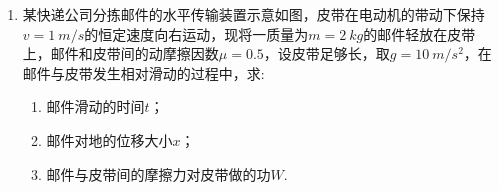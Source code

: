 \begin{enumerate}[leftmargin=0em]
\begin{enumerate}
\end{enumerate}




\item 
{}
某快递公司分拣邮件的水平传输装置示意如图，皮带在电动机的带动下保持$ v=1 \ m/s $的恒定速度向右运动，现将一质量为$ m=2 \ kg $的邮件轻放在皮带上，邮件和皮带间的动摩擦因数$ \mu =0.5 $，设皮带足够长，取$ g=10 \ m/s^{2} $，在邮件与皮带发生相对滑动的过程中，求:
\begin{enumerate}
\renewcommand{\labelenumi}{\arabic{enumi}.}
\item
邮件滑动的时间$ t $；
\item 
邮件对地的位移大小$ x $；
\item 
邮件与皮带间的摩擦力对皮带做的功$ W $.

\end{enumerate}
\begin{figure}[h!]
\flushright

\end{figure}

\end{enumerate}
